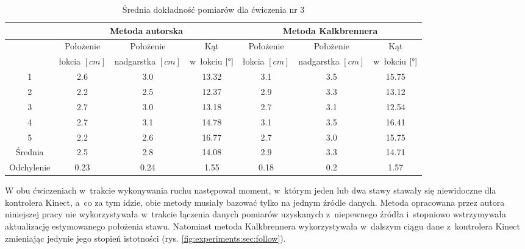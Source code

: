 \begin{table}[!htp]
	\caption{Średnia dokładność pomiarów dla ćwiczenia nr 3}
	\label{tab:experiments:thr:avg}
	\noindent
	\tiny
	\centering
	\begin{tabular}{|c|c|c|c|c|c|c|}
		\hline 
		& \multicolumn{3}{c|}{Metoda autorska} & \multicolumn{3}{c|}{Metoda Kalkbrennera}  \\ 
		\hline 
		           & Położenie    & Położenie       & Kąt                  & Położenie    & Położenie       & Kąt                  \\
		           & łokcia $[cm]$ & nadgarstka $[cm]$ & w~łokciu	$[\degree]$ & łokcia $[cm]$ & nadgarstka $[cm]$ & w~łokciu	$[\degree]$ \\
		\hline
		1          & 2.6            & 3.0               & 13.32                 & 3.1            & 3.5               & 15.75                 \\
		2          & 2.2            & 2.5               & 12.37                 & 2.9            & 3.3               & 13.12                 \\
		3          & 2.7            & 3.0               & 13.18                 & 2.7            & 3.1               & 12.54                 \\
		4          & 2.7            & 3.1               & 14.78                 & 3.1            & 3.5               & 16.41                 \\
		5          & 2.2            & 2.6               & 16.77                 & 2.7            & 3.0               & 15.75                 \\
		\hline
		Średnia   & 2.5            & 2.8               & 14.08                 & 2.9            & 3.3               & 14.71                 \\
		Odchylenie & 0.23           & 0.24              & 1.55                  & 0.18           & 0.2               & 1.57                  \\
		\hline
	\end{tabular} 
	
\end{table} 

W obu ćwiczeniach w~trakcie wykonywania ruchu następował moment, w~którym jeden lub dwa stawy stawały się niewidoczne dla kontrolera Kinect, a~co za tym idzie, obie metody musiały bazować tylko na jednym źródle danych. Metoda opracowana przez autora niniejszej pracy nie wykorzystywała  w~trakcie łączenia danych pomiarów uzyskanych z~niepewnego źródła i~stopniowo wstrzymywała aktualizację estymowanego położenia stawu. Natomiast metoda Kalkbrennera wykorzystywała w~dalszym ciągu dane z~kontrolera Kinect zmieniając jedynie jego stopień istotności (rys. \ref{fig:experiments:sec:follow}). 

